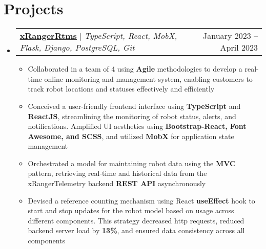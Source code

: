 \documentclass[letterpaper,11pt]{article}
\makeatletter
\newcommand{\resumeItem}[1]{
  \item\small{
    {#1 \vspace{-2pt}}
  }
}
\newcommand{\resumeProjectHeading}[2]{
    \item
    \begin{tabular*}{0.97\textwidth}{l@{\extracolsep{\fill}}r}
      \small#1 & #2 \\
    \end{tabular*}\vspace{-7pt}
}
\newcommand{\resumeSubHeadingListStart}{\begin{itemize}[leftmargin=0.15in, label={}]}
\newcommand{\resumeSubHeadingListEnd}{\end{itemize}}
\newcommand{\resumeItemListStart}{\begin{itemize}}
\newcommand{\resumeItemListEnd}{\end{itemize}\vspace{-5pt}}
\makeatother
\begin{document}
\section{Projects}
    \resumeSubHeadingListStart
      \resumeProjectHeading
          {\textbf{\underline{\href{https://github.com/xRanger-RTMS}{xRangerRtms}}} $|$ \emph{TypeScript, React, MobX, Flask, Django, PostgreSQL, Git}}{January 2023 -- April 2023}
          \resumeItemListStart
            \resumeItem{Collaborated in a team of 4 using \textbf{Agile} methodologies to develop a real-time online monitoring and management system, enabling customers to track robot locations and statuses effectively and efficiently}
            \resumeItem{Conceived a user-friendly frontend interface using \textbf{TypeScript} and \textbf{ReactJS}, streamlining the monitoring of robot status, alerts, and notifications. Amplified UI aesthetics using \textbf{Bootstrap-React, Font Awesome, and SCSS}, and utilized \textbf{MobX} for application state management}
            \resumeItem{Orchestrated a model for maintaining robot data using the \textbf{MVC} pattern, retrieving real-time and historical data from the xRangerTelemetry backend \textbf{REST API} asynchronously}
            \resumeItem{Devised a reference counting mechanism using React \textbf{useEffect} hook to start and stop updates for the robot model based on usage across different components. This strategy decreased http requests, reduced backend server load by \textbf{13\%}, and ensured data consistency across all components}
          \resumeItemListEnd
    \resumeSubHeadingListEnd
\end{document}
